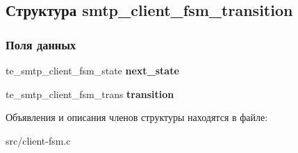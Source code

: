 \hypertarget{structsmtp__client__fsm__transition}{\subsection{Структура smtp\-\_\-client\-\_\-fsm\-\_\-transition}
\label{structsmtp__client__fsm__transition}
}
\subsubsection*{Поля данных}
\begin{DoxyCompactItemize}
\item 
\hypertarget{structsmtp__client__fsm__transition_a2f4d36ccdeeb207b2961605f9695689b}{te\-\_\-smtp\-\_\-client\-\_\-fsm\-\_\-state {\bfseries next\-\_\-state}}\label{structsmtp__client__fsm__transition_a2f4d36ccdeeb207b2961605f9695689b}

\item 
\hypertarget{structsmtp__client__fsm__transition_a8a1fae3f2552e61fa1ab9890338759e2}{te\-\_\-smtp\-\_\-client\-\_\-fsm\-\_\-trans {\bfseries transition}}\label{structsmtp__client__fsm__transition_a8a1fae3f2552e61fa1ab9890338759e2}

\end{DoxyCompactItemize}


Объявления и описания членов структуры находятся в файле\-:\begin{DoxyCompactItemize}
\item 
src/client-\/fsm.\-c\end{DoxyCompactItemize}
